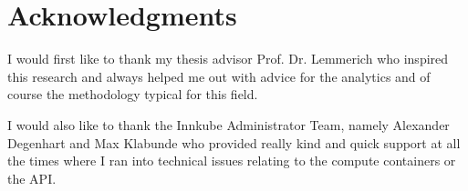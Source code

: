 \chapter*{Acknowledgments}

I would first like to thank my thesis advisor Prof. Dr. Lemmerich who inspired this research and always helped me out with advice for the analytics and of course the methodology typical for this field.

I would also like to thank the Innkube Administrator Team, namely Alexander Degenhart and Max Klabunde who provided really kind and quick support at all the times where I ran into technical issues relating to the compute containers or the API.
